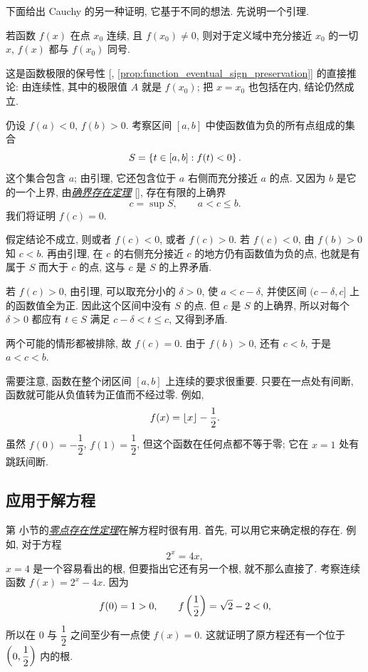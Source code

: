 下面给出 Cauchy 的另一种证明, 它基于不同的想法.
先说明一个引理.

\begin{namedtheorem}[引理]\label{lem:continuous_sign_preservation}
若函数 $f(x)$ 在点 $x_0$ 连续, 且 $f(x_0)\neq0$,
则对于定义域中充分接近 $x_0$ 的一切 $x$, $f(x)$ 都与 $f(x_0)$ 同号.
\end{namedtheorem}

这是函数极限的保号性 [, \ref{prop:function_eventual_sign_preservation}] 的直接推论:
由连续性, 其中的极限值 $A$ 就是 $f(x_0)$;
把 $x=x_0$ 也包括在内, 结论仍然成立.

\quad
仍设 $f(a)<0$, $f(b)>0$.
考察区间 $[a,b]$ 中使函数值为负的所有点组成的集合
$$
S=\left\{ t\in[a,b]:f(t)<0 \right\}.
$$
这个集合包含 $a$; 由引理, 它还包含位于 $a$ 右侧而充分接近 $a$ 的点.
又因为 $b$ 是它的一个上界, 由\hyperref[thm:supremum_infimum_existence]{\emph{确界存在定理}}
[], 存在有限的上确界
$$
c=\sup S,\qquad a<c\leq b.
$$
我们将证明 $f(c)=0$.

假定结论不成立, 则或者 $f(c)<0$, 或者 $f(c)>0$.
若 $f(c)<0$, 由 $f(b)>0$ 知 $c<b$.
再由引理, 在 $c$ 的右侧充分接近 $c$ 的地方仍有函数值为负的点,
也就是有属于 $S$ 而大于 $c$ 的点, 这与 $c$ 是 $S$ 的上界矛盾.

若 $f(c)>0$, 由引理, 可以取充分小的 $\delta>0$, 使 $a<c-\delta$,
并使区间 $(c-\delta,c]$ 上的函数值全为正.
因此这个区间中没有 $S$ 的点.
但 $c$ 是 $S$ 的上确界, 所以对每个 $\delta>0$ 都应有 $t\in S$ 满足
$c-\delta<t\leq c$, 又得到矛盾.

两个可能的情形都被排除, 故 $f(c)=0$.
由于 $f(b)>0$, 还有 $c<b$, 于是 $a<c<b$.

需要注意, 函数在整个闭区间 $[a,b]$ 上连续的要求很重要.
只要在一点处有间断, 函数就可能从负值转为正值而不经过零.
例如,
$$
f(x)=\left\lfloor x \right\rfloor-\frac12.
$$
虽然 $f(0)=-\dfrac12$, $f(1)=\dfrac12$, 但这个函数在任何点都不等于零;
它在 $x=1$ 处有跳跃间断.

\subsection{应用于解方程}\label{subsec:81}
第  小节的\hyperref[thm:bolzano_cauchy_zero]{\emph{零点存在性定理}}在解方程时很有用.
首先, 可以用它来确定根的存在.
例如, 对于方程
$$
2^x=4x,
$$
$x=4$ 是一个容易看出的根, 但要指出它还有另一个根, 就不那么直接了.
考察连续函数 $f(x)=2^x-4x$. 因为
$$
f(0)=1>0,\qquad f\left( \frac12 \right)=\sqrt2-2<0,
$$
所以在 $0$ 与 $\dfrac12$ 之间至少有一点使 $f(x)=0$.
这就证明了原方程还有一个位于 $\left( 0,\dfrac12 \right)$ 内的根.

